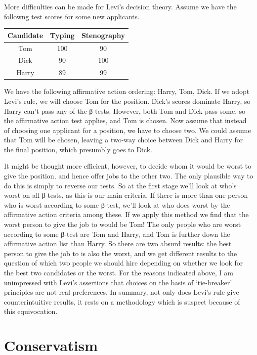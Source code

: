 \documentclass[
  10pt,
  letterpaper,
  DIV=11,
  numbers=noendperiod,
  twoside]{scrartcl}
\begin{document}
More difficulties can be made for Levi's decision theory. Assume we have
the followng test scores for some new applicants.

\begin{longtable}[]{@{}ccc@{}}
\toprule\noalign{}
Candidate & Typing & Stenography \\
\midrule\noalign{}
\endhead
\bottomrule\noalign{}
\endlastfoot
Tom & 100 & 90 \\
Dick & 90 & 100 \\
Harry & 89 & 99 \\
\end{longtable}

We have the following affirmative action ordering: Harry, Tom, Dick. If
we adopt Levi's rule, we will choose Tom for the position. Dick's scores
dominate Harry, so Harry can't pass any of the β-tests. However, both
Tom and Dick pass some, so the affirmative action test applies, and Tom
is chosen. Now assume that instead of choosing one applicant for a
position, we have to choose two. We could assume that Tom will be
chosen, leaving a two-way choice between Dick and Harry for the final
position, which presumbly goes to Dick.

It might be thought more efficient, however, to decide whom it would be
worst to give the position, and hence offer jobs to the other two. The
only plausible way to do this is simply to reverse our tests. So at the
first stage we'll look at who's worst on all β-tests, as this is our
main criteria. If there is more than one person who is worst according
to some β-test, we'll look at who does worst by the affirmative action
criteria among these. If we apply this method we find that the worst
person to give the job to would be Tom! The only people who are worst
according to some β-test are Tom and Harry, and Tom is further down the
affirmative action list than Harry. So there are two absurd results: the
best person to give the job to is also the worst, and we get different
results to the question of which two people we should hire depending on
whether we look for the best two candidates or the worst. For the
reasons indicated above, I am unimpressed with Levi's assertions that
choices on the basis of `tie-breaker' principles are not real
preferences. In summary, not only does Levi's rule give counterintuitive
results, it rests on a methodology which is suspect because of this
equivocation.

\section{Conservatism}\label{conservatism}
\end{document}
